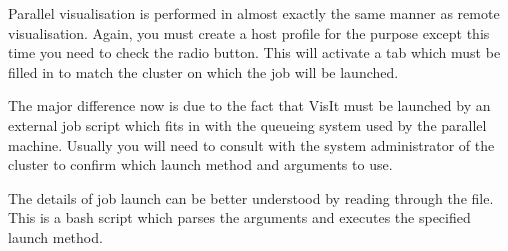   Parallel visualisation is performed in almost exactly the same manner
  as remote visualisation. Again, you must create a host profile for the
  purpose except this time you need to check the  radio button. This will activate a  tab
  which must be filled in to match the cluster on which the job will
  be launched.

  The major difference now is due to the fact that VisIt must be launched
  by an external job script which fits in with the queueing system used
  by the parallel machine. Usually you will need to consult with the
  system administrator of the cluster to confirm which launch method and
  arguments to use.

  The details of job launch can be better understood by reading through
  the file\linebreak {}. This is
  a bash script which parses the arguments and executes the specified
  launch method.
%
%

